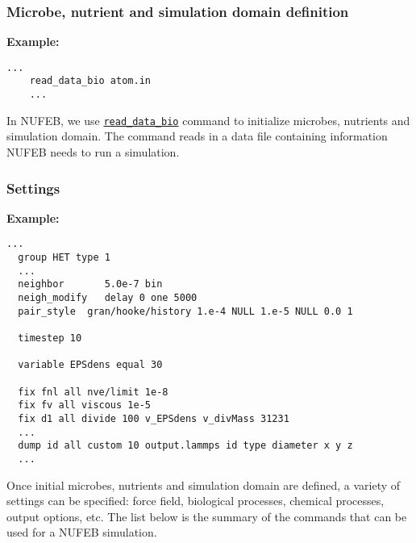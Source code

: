 \documentclass[11pt,a4paper,openright]{article}
\begin{document}
\subsubsection{Microbe, nutrient and simulation domain definition}
\textbf{Example:}
\begin{Verbatim}[frame=single]
    ...
    read_data_bio atom.in
    ...
\end{Verbatim}

In NUFEB, we use 
\hyperref[readdata]{\tt read\_data\_bio} command
to initialize microbes, nutrients and simulation domain. 
The command reads in a data file containing information NUFEB needs to run a simulation. 

\newpage
\subsubsection{Settings}
\textbf{Example:}
\begin{Verbatim}[frame=single]
  ...
  group HET type 1
  ...
  neighbor       5.0e-7 bin
  neigh_modify   delay 0 one 5000
  pair_style  gran/hooke/history 1.e-4 NULL 1.e-5 NULL 0.0 1
  
  timestep 10
  
  variable EPSdens equal 30
  
  fix fnl all nve/limit 1e-8 
  fix fv all viscous 1e-5
  fix d1 all divide 100 v_EPSdens v_divMass 31231
  ...
  dump id all custom 10 output.lammps id type diameter x y z
  ...
\end{Verbatim}

Once initial microbes, nutrients and simulation domain are defined, a variety of settings can be specified: force field, biological processes, chemical processes, output options, etc. The list below is the
summary of the commands that can be used for a NUFEB simulation.\\
\end{document}
